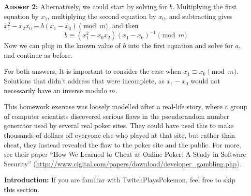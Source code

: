 \documentclass[]{article}
\begin{document}
\begin{qunlist}
{{\bigskip\textbf{Answer 2:}
Alternatively, we could start by solving for $b$.  Multiplying the first equation by $x_1$, multiplying the second equation by $x_0$, and subtracting gives $x_1^2 - x_2 x_0 \equiv b (x_1-x_0) \pmod{m}$, and then
\begin{equation*}
b \equiv (x_1^2 - x_0 x_2)(x_1 - x_0)^{-1} \pmod{m}
\end{equation*}
Now we can plug in the known value of $b$ into the first equation and solve for $a$,  and continue as before.

 For both answers, It is important to consider the case when $x_1 \equiv x_0 \pmod m$. Solutions that didn't address that were incomplete, as $x_1 - x_0$ would not necessarily have an inverse modulo $m$.

This homework exercise was loosely modelled after a real-life story, where a group of computer scientists discovered serious flaws in the pseudorandom number generator used by several real poker sites. They could have used this to make thousands of dollars off everyone else who played at that site, but rather than cheat, they instead revealed the flaw to the poker site and the public. For more, see their paper
``How We Learned to Cheat at Online Poker: A Study in Software Security''
(\url{http://www.cigital.com/papers/download/developer_gambling.php}).

}}\fi





\textbf{Introduction:} If you are familiar with TwitchPlaysPokemon, feel free to skip this section.


\end{qunlist}
\end{document}
